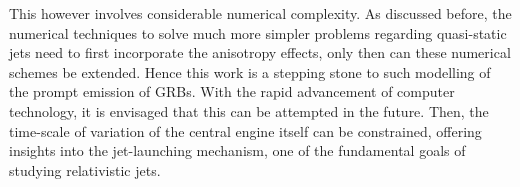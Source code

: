 This however involves considerable numerical complexity. As discussed before, the numerical techniques to solve much more simpler problems regarding quasi-static jets need to first incorporate the anisotropy effects, only then can these numerical schemes be extended. Hence this work is a stepping stone to such modelling of the prompt emission of GRBs. With the rapid advancement of computer technology, it is envisaged that this can be attempted in the future. Then, the time-scale of variation of the central engine itself can be constrained, offering insights into the jet-launching mechanism, one of the fundamental goals of studying relativistic jets.
